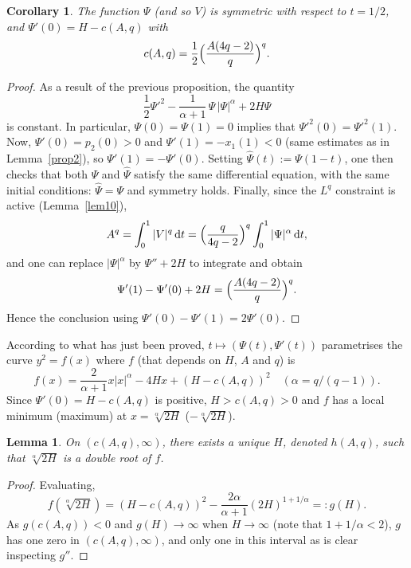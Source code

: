 \documentclass[JEP,XML,SOM,Unicode,NoEqCountersInSection,NoFloatCountersInSection]{cedram}
\theoremstyle{plain}
\newtheorem{lemma}[theorem]{Lemma}
\newtheorem{cor}[theorem]{Corollary}
\theoremstyle{definition}
\renewcommand{\d}{\mathrm{d}}
\begin{document}
\begin{cor} \label{cor13}
The function $\Psi$ (and so $V$) is symmetric with respect to $t=1/2$, and
$\Psi'(0)=H-c(A,q)$ with
\[
c(A,q) = \frac{1}{2} \Bigl(\frac{A(4q-2)}{q} \Bigr)^q.
\]
\end{cor}
\begin{proof}
As a result of the previous proposition, the quantity
\[
\frac{1}{2}\Psi'^2-\frac{1}{\alpha+1}\,\Psi\,|\Psi|^\alpha+2H\Psi
\]
is constant. In particular, $\Psi(0)=\Psi(1)=0$ implies that $\Psi'^2(0)=\Psi'^2(1)$.
Now, $\Psi'(0)=p_2(0)>0$ and $\Psi'(1)=-x_1(1)<0$ (same estimates as in
Lemma~\ref{prop2}), so $\Psi'(1)=-\Psi'(0)$. Setting
$\hat{\Psi}(t):=\Psi(1-t)$, one then checks that both $\Psi$ and $\hat{\Psi}$ satisfy
the same differential equation, with the same initial conditions: $\hat{\Psi}=\Psi$
and symmetry holds.
Finally, since the $L^q$ constraint is
active (Lemma~\ref{lem10}),
\[
A^q = \int_0^1 |V|^q\,\d t
= \Bigl(\frac{q}{4q-2} \Bigr)^q \int_0^1 |\Psi|^\alpha\,\d t,
\]
and one can replace $|\Psi|^\alpha$ by $\Psi''+2H$ to integrate and obtain
\[
\Psi'(1)-\Psi'(0)+2H = \Bigl(\frac{A(4q-2)}{q} \Bigr)^q.
\]
Hence the conclusion using $\Psi'(0)-\Psi'(1)=2\Psi'(0)$.
\end{proof}

According to what has just been proved, $t \mapsto (\Psi(t),\Psi'(t))$
parametrises the curve $y^2=f(x)$ where $f$ (that depends on $H$, $A$ and $q$) is
\begin{equation} \label{eq61}
f(x) = \frac{2}{\alpha+1}x|x|^\alpha-4Hx+(H-c(A,q))^2 \quad (\alpha=q/(q-1)).
\end{equation}
Since $\Psi'(0)=H-c(A,q)$ is positive, $H > c(A,q) > 0$ and $f$ has a local minimum
(\resp maximum) at $x=\sqrt[\alpha]{2H}$ (\resp $-\sqrt[\alpha]{2H}$).

\begin{lemma} \label{lem12}
On $(c(A,q),\infty)$, there exists a unique $H$, denoted $h(A,q)$,
such that $\sqrt[\alpha]{2H}$ is a double root of $f$.
\end{lemma}
\begin{proof}
Evaluating,
\[
f(\sqrt[\alpha]{2H}) = (H-c(A,q))^2-\frac{2\alpha}{\alpha+1}(2H)^{1+1/\alpha}
=: g(H).
\]
As $g(c(A,q))<0$ and $g(H) \to \infty$ when $H \to \infty$ (note that $1+1/\alpha<2$),
$g$ has one zero in $(c(A,q),\infty)$, and only one in this interval as is clear
inspecting $g''$.
\end{proof}
\end{document}
